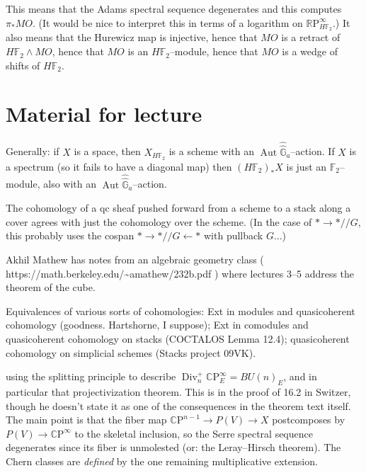 \documentclass{article}
\newcommand{\F}{\mathbb F}
\newcommand{\G}{\widehat{\mathbb G}}
\newcommand{\R}{\mathbb R}
\newcommand{\RP}{\R\mathrm P}
\newcommand{\C}{\mathbb{C}}
\newcommand{\CP}{\C\mathrm P}
\newcommand{\<}{\langle}
\renewcommand{\>}{\rangle}
\newcommand{\sm}{\wedge}
\newcommand{\mmod}{/\!\!/}
\DeclareMathOperator{\Div}{Div}
\DeclareMathOperator{\Aut}{Aut}
\numberwithin{equation}{section}
\theoremstyle{plain}
\theoremstyle{definition}
\theoremstyle{remark}
\begin{document}
This means that the Adams spectral sequence degenerates and this computes $\pi_* MO$.  (It would be nice to interpret this in terms of a logarithm on $\RP^\infty_{H\F_2}$.)  It also means that the Hurewicz map is injective, hence that $MO$ is a retract of $H\F_2 \sm MO$, hence that $MO$ is an $H\F_2$--module, hence that $MO$ is a wedge of shifts of $H\F_2$.










\section*{Material for lecture}







Generally: if $X$ is a space, then $X_{H\F_2}$ is a scheme with an $\Aut \widehat \G_a$--action. If $X$ is a spectrum (so it fails to have a diagonal map) then $(H\F_2)_* X$ is just an $\F_2$--module, also with an $\Aut \widehat \G_a$--action.

The cohomology of a qc sheaf pushed forward from a scheme to a stack along a cover agrees with just the cohomology over the scheme. (In the case of $* \to * \mmod G$, this probably uses the cospan $* \to * \mmod G \leftarrow *$ with pullback $G$...)

Akhil Mathew has notes from an algebraic geometry class ( https://math.berkeley.edu/{\textasciitilde}amathew/232b.pdf ) where lectures 3--5 address the theorem of the cube.

Equivalences of various sorts of cohomologies: Ext in modules and quasicoherent cohomology (goodness. Hartshorne, I suppose); Ext in comodules and quasicoherent cohomology on stacks (COCTALOS Lemma 12.4); quasicoherent cohomology on simplicial schemes (Stacks project 09VK).

using the splitting principle to describe $\Div^+_n \CP^\infty_E = BU(n)_E$, and in particular that projectivization theorem. This is in the proof of 16.2 in Switzer, though he doesn't state it as one of the consequences in the theorem text itself. The main point is that the fiber map $\CP^{n-1} \to P(V) \to X$ postcomposes by $P(V) \to \CP^\infty$ to the skeletal inclusion, so the Serre spectral sequence degenerates since its fiber is unmolested (or: the Leray--Hirsch theorem). The Chern classes are \emph{defined} by the one remaining multiplicative extension.
\end{document}
